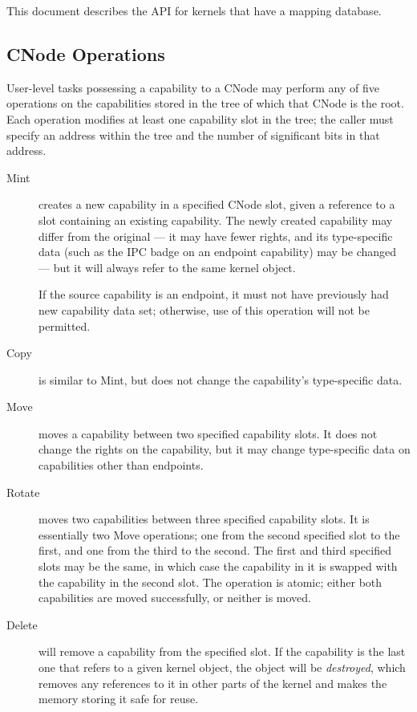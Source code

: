 This document describes the API for kernels that have a mapping database.

\subsection{CNode Operations}\label{sec:overview.cspace.cnodes}

User-level tasks possessing a capability to a CNode may perform any of five
operations on the capabilities stored in the tree of which that CNode is the
root. Each operation modifies at least one capability slot in the tree; the
caller must specify an address within the tree and the number of significant
bits in that address.

\begin{description}
\item[Mint] creates a new capability in a specified CNode slot, given a
reference to a slot containing an existing capability. The newly created
capability may differ from the original --- it may have fewer rights, and its
type-specific data (such as the IPC badge on an endpoint capability) may be
changed ---  but it will always refer to the same kernel object.

If the source capability is an endpoint, it must not have previously had
new capability data set; otherwise, use of this operation will not be permitted.

\item[Copy] is similar to Mint, but does not change the capability's
type-specific data.

\item[Move] moves a capability between two specified capability slots. It does
not change the rights on the capability, but it may change type-specific data
on capabilities other than endpoints.

\item[Rotate] moves two capabilities between three specified capability slots. It is essentially two Move operations; one from the second specified slot to the first, and one from the third to the second. The first and third specified slots may be the same, in which case the capability in it is swapped with the capability in the second slot. The operation is atomic; either both capabilities are moved successfully, or neither is moved.

\item[Delete] will remove a capability from the specified slot. If the capability is the last one that refers to a given kernel object, the object will be \emph{destroyed}, which removes any references to it in other parts of the kernel and makes the memory storing it safe for reuse.


\end{description}
